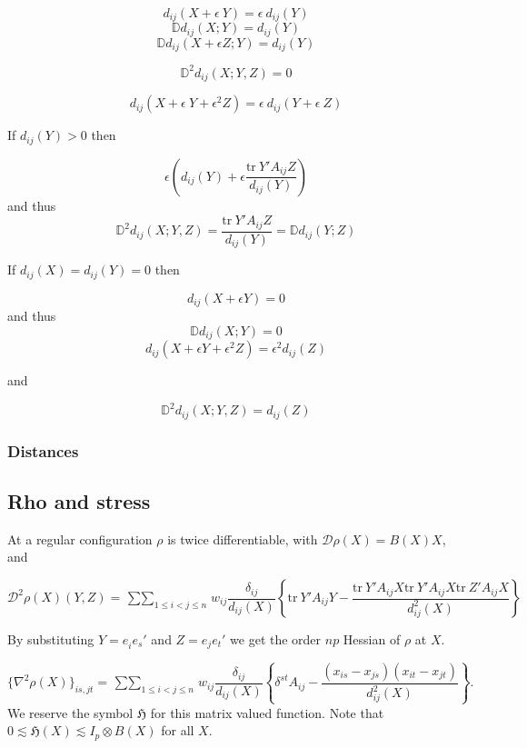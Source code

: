 \documentclass[
  12pt,
]{book}
\theoremstyle{definition}
\theoremstyle{definition}
\theoremstyle{definition}
\theoremstyle{definition}
\theoremstyle{remark}
\begin{document}
\[
d_{ij}(X+\epsilon\ Y)=\epsilon\ d_{ij}(Y)
\]
\[
\mathbb{D}d_{ij}(X;Y)= d_{ij}(Y)
\]
\[
\mathbb{D}d_{ij}(X+\epsilon Z;Y)= d_{ij}(Y)
\]

\[
\mathbb{D}^2d_{ij}(X;Y,Z)=0
\]

\[
d_{ij}(X+\epsilon\ Y+\epsilon^2 Z)=\epsilon\ d_{ij}(Y+\epsilon\ Z)
\]

If \(d_{ij}(Y)>0\) then

\[
\epsilon(d_{ij}(Y) + \epsilon\frac{\text{tr}\ Y'A_{ij}Z}{d_{ij}(Y)})
\]
and thus
\[
\mathbb{D}^2d_{ij}(X;Y,Z)=\frac{\text{tr}\ Y'A_{ij}Z}{d_{ij}(Y)}=\mathbb{D}d_{ij}(Y;Z)
\]

If \(d_{ij}(X)=d_{ij}(Y)=0\) then

\[
d_{ij}(X+\epsilon Y)=0
\]
and thus
\[
\mathbb{D}d_{ij}(X;Y)=0
\]
\[
d_{ij}(X+\epsilon Y+\epsilon^2 Z)=\epsilon^2 d_{ij}(Z)
\]

and

\[
\mathbb{D}^2d_{ij}(X;Y,Z)=d_{ij}(Z)
\]

\hypertarget{distances-1}{%
\subsubsection{Distances}\label{distances-1}}

\hypertarget{rho-and-stress}{%
\subsection{Rho and stress}\label{rho-and-stress}}

At a regular configuration \(\rho\) is twice differentiable, with \(\mathcal{D}\rho(X)=B(X)X\), and

\begin{equation}
\mathcal{D}^2\rho(X)(Y,Z)=\mathop{\sum\sum}_{1\leq i<j\leq n}w_{ij}\frac{\delta_{ij}}{d_{ij}(X)}\left\{\text{tr}\ Y'A_{ij}Y-\frac{\text{tr}\ Y'A_{ij}X\text{tr}\ Y'A_{ij}X\text{tr}\ Z'A_{ij}X}{d_{ij}^2(X)}\right\}
\label{eq:rhoder2}
\end{equation}

By substituting \(Y=e_i^{\ }e_s'\) and \(Z=e_je_t'\) we get the order \(np\) Hessian of \(\rho\) at \(X\).

\[
\{\nabla^2\rho(X)\}_{is,jt}=\mathop{\sum\sum}_{1\leq i<j\leq n}w_{ij}\frac{\delta_{ij}}{d_{ij}(X)}\left\{\delta^{st}A_{ij}-\frac{(x_{is}-x_{js})(x_{it}-x_{jt})}{d_{ij}^2(X)}\right\}.
\]
We reserve the symbol \(\mathfrak{H}\) for this matrix valued function. Note that \(0\lesssim\mathfrak{H}(X)\lesssim I_p\otimes B(X)\) for all \(X\).
\end{document}
